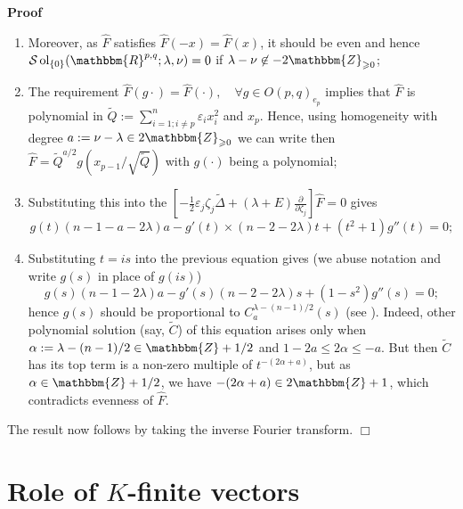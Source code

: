\documentclass{article}
\newcommand{\assign}{:=}
\newcommand{\nin}{\not\in}
\newcommand{\tmop}[1]{\ensuremath{\operatorname{#1}}}
\newenvironment{proof}{\noindent\textbf{Proof\ }}{\hspace*{\fill}$\Box$\medskip}
\numberwithin{definition}{section}
\numberwithin{lemma}{section}
\numberwithin{proposition}{section}
{\theorembodyfont{\rmfamily}\newtheorem{remark}{Remark}
\numberwithin{remark}{section}
}
\begin{document}
\begin{proof}
\begin{enumerate}
    \item Moreover, as $\hat{F}$ satisfies $\hat{F} ( - x) = \hat{F} ( x)$, it
    should be even and hence $\mathcal{S} \tmop{ol}_{\{ 0 \}} (
    \mathbbm{R}^{p, q} ; \lambda, \nu) = 0$ if $\lambda - \nu \nin -
    2\mathbbm{Z}_{\geqslant 0}$;
    
    \item The requirement $\hat{F} ( g \cdot) = \hat{F} ( \cdot), \hspace{1em}
    \forall g \in O ( p, q)_{e_p}$ implies that $\hat{F}$ is polynomial in
    $\tilde{Q} \assign \sum_{i = 1 ; i \neq p}^n \varepsilon_i x_i^2$ and
    $x_p$. Hence, using homogeneity with degree $a \assign \nu - \lambda \in
    2\mathbbm{Z}_{\geqslant 0}$ we can write then $\hat{F} = \tilde{Q}^{a / 2}
    g \left( x_{p - 1} / \sqrt{\tilde{Q}} \right)$ with $g ( \cdot)$ being a
    polynomial;
    
    \item Substituting this into the $\left[ - \frac{1}{2} \varepsilon_j
    \zeta_j \tilde{\Delta} + ( \lambda + E) \frac{\partial}{\partial \zeta_j}
    \right] \hat{F} = 0$ gives
    \[ g ( t) ( n - 1 - a - 2 \lambda) a - g' ( t) \times ( n - 2 - 2
       \lambda) t + ( t^2 + 1) g'' ( t) = 0 ; \]
    \item Substituting $t = i s$ into the previous equation gives (we abuse
    notation and write $g ( s)$ in place of $g ( i s)$)
    \[ g ( s) ( n - 1 - 2 \lambda) a - g' ( s) ( n - 2 - 2 \lambda) s + ( 1 -
       s^2) g'' ( s) = 0 ; \]
    hence $g ( s)$ should be proportional to $C^{\lambda - ( n - 1) / 2}_a (
    s)$ (see {\cite[thm. 11.4]{kobayashi2015differential2}}). Indeed, other
    polynomial solution (say, $\tilde{C}$) of this equation arises only when
    $\alpha \assign \lambda - ( n - 1) / 2 \in \mathbbm{Z}+ 1 / 2$ and $1 - 2
    a \leqslant 2 \alpha \leqslant - a$. But then $\tilde{C}$ has its top term
    is a non-zero multiple of $t^{- ( 2 \alpha + a)}$, but as $\alpha \in
    \mathbbm{Z}+ 1 / 2$, we have $- ( 2 \alpha + a) \in 2\mathbbm{Z}+ 1$,
    which contradicts evenness of $\hat{F}$.
  \end{enumerate}
  The result now follows by taking the inverse Fourier transform.
\end{proof}

\section{Role of $K$-finite vectors}\label{sec:k-finite}
\end{document}

